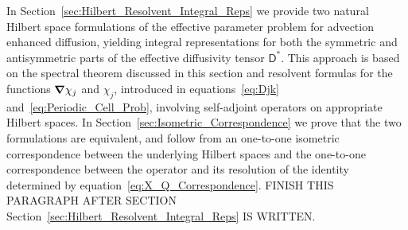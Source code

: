 \documentclass[leqno,onefignum,onetabnum]{siamltex1213}
\newcommand{\secref}[1]{Section~\ref{#1}}
\newcommand{\Dm}{\mathsf{D}}
\newcommand\bnabla{\mbox{\boldmath${\nabla}$}}
\begin{document}
In \secref{sec:Hilbert_Resolvent_Integral_Reps} we provide two natural Hilbert space
formulations of the effective parameter problem for advection enhanced
diffusion, yielding integral representations for both the symmetric and
antisymmetric parts of the effective diffusivity tensor $\Dm^*$. This
approach is based on the spectral theorem discussed in this section
and resolvent formulas for the functions $\bnabla\chi_j$ and $\chi_j$,
introduced in equations~\eqref{eq:Djk}
and~\eqref{eq:Periodic_Cell_Prob}, involving self-adjoint operators on
appropriate Hilbert spaces. In \secref{sec:Isometric_Correspondence}
we prove that the two formulations are equivalent, and follow from an
one-to-one isometric correspondence between the underlying Hilbert
spaces and the one-to-one correspondence between the operator and its
resolution of the identity determined by
equation~\eqref{eq:X_Q_Correspondence}.
FINISH THIS PARAGRAPH AFTER SECTION
\secref{sec:Hilbert_Resolvent_Integral_Reps} IS WRITTEN. 
\end{document}
